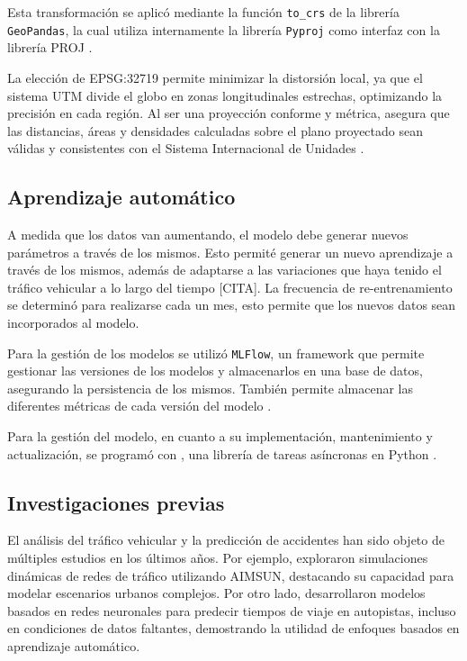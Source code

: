 \documentclass[12pt]{article}
\begin{document}
Esta transformación se aplicó mediante la función \texttt{to\_crs} de la librería \texttt{GeoPandas}, la cual utiliza internamente la librería \texttt{Pyproj} como interfaz con la librería PROJ \citep{gdal_proj, pyproj, geopandas}.

La elección de EPSG:32719 permite minimizar la distorsión local, ya que el sistema UTM divide el globo en zonas longitudinales estrechas, optimizando la precisión en cada región. Al ser una proyección conforme y métrica, asegura que las distancias, áreas y densidades calculadas sobre el plano proyectado sean válidas y consistentes con el Sistema Internacional de Unidades \citep{epsg32719}.

\subsection{Aprendizaje automático}

A medida que los datos van aumentando, el modelo debe generar nuevos parámetros a través de los mismos. Esto permité generar un nuevo aprendizaje a través de los mismos, además de adaptarse a las variaciones que haya tenido el tráfico vehicular a lo largo del tiempo [CITA]. La frecuencia de re-entrenamiento se determinó para realizarse cada un mes, esto permite que los nuevos datos sean incorporados al modelo.

Para la gestión de los modelos se utilizó \texttt{MLFlow}, un framework que permite gestionar las versiones de los modelos y almacenarlos en una base de datos, asegurando la persistencia de los mismos. También permite almacenar las diferentes métricas de cada versión del modelo \citep{mlflow2025}.

Para la gestión del modelo, en cuanto a su implementación, mantenimiento y actualización, se programó con , una librería de tareas asíncronas en Python \citep{apscheduler2025}.

\subsection{Investigaciones previas}

El análisis del tráfico vehicular y la predicción de accidentes han sido objeto de múltiples estudios en los últimos años. Por ejemplo, \textcite{barcelo2005} exploraron simulaciones dinámicas de redes de tráfico utilizando AIMSUN, destacando su capacidad para modelar escenarios urbanos complejos. Por otro lado, \textcite{vanlint2005} desarrollaron modelos basados en redes neuronales para predecir tiempos de viaje en autopistas, incluso en condiciones de datos faltantes, demostrando la utilidad de enfoques basados en aprendizaje automático.
\end{document}
